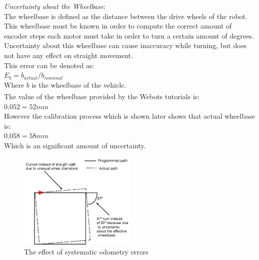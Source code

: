 \textit{Uncertainty about the Wheelbase}:\\
The wheelbase is defined as the distance between the drive wheels of the robot. This wheelbase must be known in order to compute the correct amount of encoder steps each motor must take in order to turn a certain amount of degrees.
Uncertainty about this wheelbase can cause inaccuracy while turning, but does not have any effect on straight movement.\\
This error can be denoted as:\\
$E_{b} = b_{actual} / b_{nominal}$\\
Where $b$ is the wheelbase of the vehicle\cite{Borenstein1996Measurement}.\\
The value of the wheelbase provided by the Webots\textsuperscript{\texttrademark} tutorials is:\\
$0.052 = 52mm$\\
However the calibration process which is shown later shows that actual wheelbase is:\\
$0.058 = 58mm$\\
Which is an significant amount of uncertainty.\\

\begin{figure}[h]
\centering
\includegraphics[width = 0.5\textwidth]{../../figures/sys_odometry_error}
\caption{The effect of systematic odometry errors}
\label{sys_error}
\end{figure}

